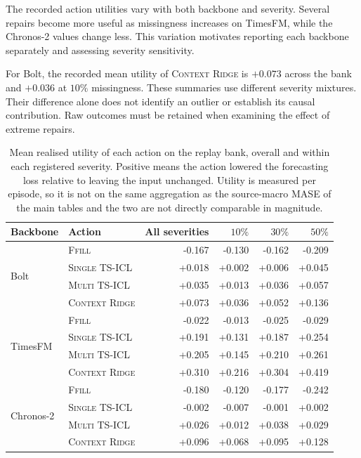 \documentclass{article}
\begin{document}
The recorded action utilities vary with both backbone and severity. Several repairs become
more useful as missingness increases on TimesFM, while the Chronos-2 values change less.
This variation motivates reporting each backbone separately and assessing severity sensitivity.

For Bolt, the recorded mean utility of \textsc{Context Ridge} is $+0.073$ across the bank
and $+0.036$ at $10\%$ missingness. These summaries use different severity mixtures.
Their difference alone does not identify an outlier or establish its causal contribution.
Raw outcomes must be retained when examining the effect of extreme repairs.

\begin{table}[htbp]
  \caption{Mean realised utility of each action on the replay bank, overall and within each
  registered severity. Positive means the action lowered the forecasting loss relative to
  leaving the input unchanged. Utility is measured per episode, so it is not on the same
  aggregation as the source-macro MASE of the main tables and the two are not directly
  comparable in magnitude.}
  \label{tab:app-utility-severity}
  \centering
  \small
  \setlength{\tabcolsep}{4pt}
\begin{tabular*}{\textwidth}{@{\extracolsep{\fill}}llrrrr@{}}
    \toprule
    Backbone & Action & All severities & $10\%$ & $30\%$ & $50\%$ \\
    \midrule
    \multirow{4}{*}{Bolt}
      & \textsc{Ffill}         & -0.167  & -0.130  & -0.162  & -0.209 \\
      & \textsc{Single TS-ICL} & +0.018 & +0.002 & +0.006 & +0.045 \\
      & \textsc{Multi TS-ICL}  & +0.035  & +0.013  & +0.036  & +0.057 \\
      & \textsc{Context Ridge} & +0.073  & +0.036  & +0.052  & +0.136 \\
    \midrule
    \multirow{4}{*}{TimesFM}
      & \textsc{Ffill}         & -0.022  & -0.013  & -0.025  & -0.029 \\
      & \textsc{Single TS-ICL} & +0.191 & +0.131 & +0.187 & +0.254 \\
      & \textsc{Multi TS-ICL}  & +0.205  & +0.145  & +0.210  & +0.261 \\
      & \textsc{Context Ridge} & +0.310  & +0.216  & +0.304  & +0.419 \\
    \midrule
    \multirow{4}{*}{Chronos-2}
      & \textsc{Ffill}         & -0.180  & -0.120  & -0.177  & -0.242 \\
      & \textsc{Single TS-ICL} & -0.002 & -0.007 & -0.001 & +0.002 \\
      & \textsc{Multi TS-ICL}  & +0.026  & +0.012  & +0.038  & +0.029 \\
      & \textsc{Context Ridge} & +0.096  & +0.068  & +0.095  & +0.128 \\
    \bottomrule
  \end{tabular*}
\end{table}
\end{document}
